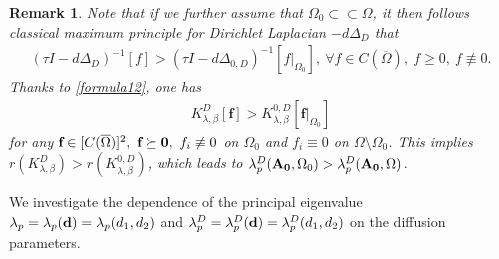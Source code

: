 \documentclass[a4paper,11pt]{amsart}
\newtheorem{theorem}{Theorem}
\newtheorem{remark}{Remark}
\theoremstyle{definition}
\def\O{\Omega}
\numberwithin{equation}{section}
\theoremstyle{definition}
\def\O{\Omega}
\begin{document}
\begin{remark}\label{strict}
Note that if we further assume that $\O_0\subset \subset \O$, it then follows classical maximum principle for Dirichlet Laplacian $-d\Delta_D$ that
\begin{align*}
\left(\tau I -d\Delta_D\right)^{-1}[f]>\left(\tau I -d\Delta_{0,D}\right)^{-1}[f|_{\O_0}],~\forall f\in C(\overline{\O}),~f\geq 0,~f\not\equiv 0.
\end{align*}
Thanks to \eqref{formula12}, one has
\begin{align*}
K^D_{\lambda,\beta}[\textbf{f}]> 	K^{0,D}_{\lambda,\beta}[\textbf{f}|_{\O_0}]
\end{align*}
for any $\textbf{f}\in [C(\overline{\O})]^2,~\textbf{f}\succeq {\bf 0},~f_i\not\equiv 0$ on $\O_0$ and $f_i\equiv 0$ on $\O\setminus \O_0$. This implies $r\left(K^D_{\lambda,\beta}\right)>r\left(K^{0,D}_{\lambda,\beta}\right)$, which leads to $\lambda^D_p({\bf A_0},\O_0)>\lambda_p^D({\bf A_0},\O)$.

\end{remark}


We investigate the dependence of the principal eigenvalue $\lambda_p=\lambda_p({\bf d})=\lambda_p(d_1,d_2)$ and $\lambda_p^D=\lambda_p^D({\bf d})=\lambda_p^D(d_1,d_2)$ on the diffusion parameters.

%
%
%
%
\end{document}
